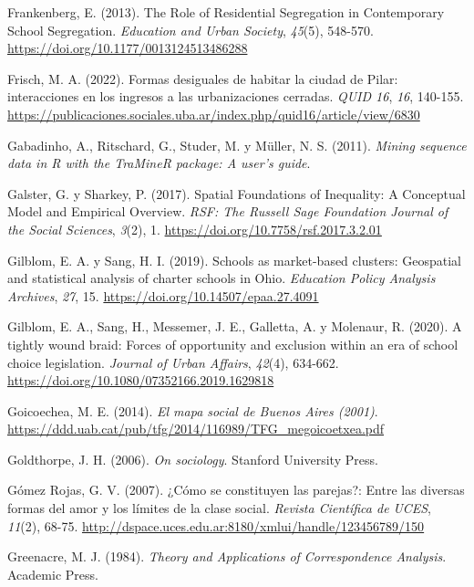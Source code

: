 \documentclass[
  spanish,
  a4paper,%
  chapterprefix=true,%
  DIV=calc,%
  twoside]{scrbook}%
\newlength{\cslhangindent}
\newenvironment{CSLReferences}[2] %
 {\begin{list}{}{%
  \setlength{\itemindent}{0pt}
  \setlength{\leftmargin}{0pt}
  \setlength{\parsep}{0pt}
  \ifodd #1
   \setlength{\leftmargin}{\cslhangindent}
   \setlength{\itemindent}{-1\cslhangindent}
  \fi
  \setlength{\itemsep}{#2\baselineskip}}}
 {\end{list}}
\begin{document}
\begin{CSLReferences}{1}{0}
Frankenberg, E. (2013). The Role of Residential Segregation in Contemporary School Segregation. \emph{Education and Urban Society}, \emph{45}(5), 548-570. \url{https://doi.org/10.1177/0013124513486288}

Frisch, M. A. (2022). Formas desiguales de habitar la ciudad de Pilar: interacciones en los ingresos a las urbanizaciones cerradas. \emph{QUID 16}, \emph{16}, 140-155. \url{https://publicaciones.sociales.uba.ar/index.php/quid16/article/view/6830}

Gabadinho, A., Ritschard, G., Studer, M. y Müller, N. S. (2011). \emph{Mining sequence data in R with the TraMineR package: A user's guide}.

Galster, G. y Sharkey, P. (2017). Spatial Foundations of Inequality: A Conceptual Model and Empirical Overview. \emph{RSF: The Russell Sage Foundation Journal of the Social Sciences}, \emph{3}(2), 1. \url{https://doi.org/10.7758/rsf.2017.3.2.01}

Gilblom, E. A. y Sang, H. I. (2019). Schools as market-based clusters: Geospatial and statistical analysis of charter schools in Ohio. \emph{Education Policy Analysis Archives}, \emph{27}, 15. \url{https://doi.org/10.14507/epaa.27.4091}

Gilblom, E. A., Sang, H., Messemer, J. E., Galletta, A. y Molenaur, R. (2020). A tightly wound braid: Forces of opportunity and exclusion within an era of school choice legislation. \emph{Journal of Urban Affairs}, \emph{42}(4), 634-662. \url{https://doi.org/10.1080/07352166.2019.1629818}

Goicoechea, M. E. (2014). \emph{El mapa social de Buenos Aires (2001)}. \url{https://ddd.uab.cat/pub/tfg/2014/116989/TFG_megoicoetxea.pdf}

Goldthorpe, J. H. (2006). \emph{On sociology}. Stanford University Press.

Gómez Rojas, G. V. (2007). ¿Cómo se constituyen las parejas?: Entre las diversas formas del amor y los límites de la clase social. \emph{Revista Científica de UCES}, \emph{11}(2), 68-75. \url{http://dspace.uces.edu.ar:8180/xmlui/handle/123456789/150}

Greenacre, M. J. (1984). \emph{Theory and Applications of Correspondence Analysis}. Academic Press.


\end{CSLReferences}
\end{document}
